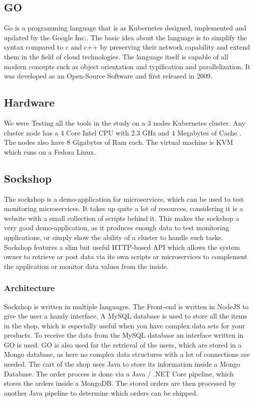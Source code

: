 \subsection{GO}
Go is a programming language that is as Kubernetes designed, implemented and updated by the Google Inc.. The basic idea about the language is to simplify the syntax compared to c and c++ by preserving their network capability and extend them in the field of cloud technologies. The language itself is capable of all modern concepts such as object orientation and typification and parallelization. It was developed as an Open-Source Software and first released in 2009.  

\subsection{Hardware}
We were Testing all the tools in the study on a 3 nodes Kubernetes cluster. Any cluster node has a 4 Core Intel CPU with 2.3 GHz and 4 Megabytes of Cache . The nodes also have 8 Gigabytes of Ram  each. The virtual machine is KVM which runs on a Fedora Linux.

\subsection{Sockshop}
The sockshop is a demo-application for microservices, which can be used to test monitoring microservices. It takes up quite a lot of resources, considering it is a website with a small collection of scripts behind it. This makes the sockshop a very good demo-application, as it produces enough data to test monitoring applications, or simply show the ability of a cluster to handle such tasks.
Sockshop features a slim but useful HTTP-based API which allows the system owner to retrieve or post data via its own scripts or microservices to complement the application or monitor data values from the inside.
\subsubsection{Architecture}
Sockshop is written in multiple languages. The Front-end is written in NodeJS to give the user a handy interface. A MySQL database is used to store all the items in the shop, which is especially useful when you have complex data sets for your products. To receive the data from the MySQL database an interface written in GO is used. 
GO is also used for the retrieval of the users, which are stored in a Mongo database, as here no complex data structures with a lot of connections are needed.
The cart of the shop uses Java to store its information inside a Mongo Database. 
The order process is done via a Java / .NET Core pipeline, which stores the orders inside a MongoDB. The stored orders are then processed by another Java pipeline to determine which orders can be shipped.

 


